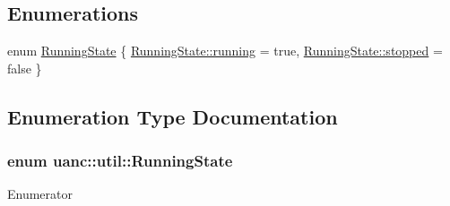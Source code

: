 \subsection*{Enumerations}
\begin{DoxyCompactItemize}
\item 
enum \hyperlink{namespaceuanc_1_1util_a1327e6c853ec100096ba39559392affd}{Running\+State} \{ \hyperlink{namespaceuanc_1_1util_a1327e6c853ec100096ba39559392affda75101dcdfc88455bcafc9e53e0b06689}{Running\+State\+::running} = true, 
\hyperlink{namespaceuanc_1_1util_a1327e6c853ec100096ba39559392affdaf0a0bfe6bc7d2c58d2989034f83183e0}{Running\+State\+::stopped} = false
 \}
\end{DoxyCompactItemize}


\subsection{Enumeration Type Documentation}
\subsubsection[{\texorpdfstring{Running\+State}{RunningState}}]{\setlength{\rightskip}{0pt plus 5cm}enum {\bf uanc\+::util\+::\+Running\+State}\hspace{0.3cm}{\ttfamily [strong]}}\hypertarget{namespaceuanc_1_1util_a1327e6c853ec100096ba39559392affd}{}\label{namespaceuanc_1_1util_a1327e6c853ec100096ba39559392affd}
\begin{Desc}
\item[Enumerator]\par
\begin{description}
\item[{\em 
running\hypertarget{namespaceuanc_1_1util_a1327e6c853ec100096ba39559392affda75101dcdfc88455bcafc9e53e0b06689}{}\label{namespaceuanc_1_1util_a1327e6c853ec100096ba39559392affda75101dcdfc88455bcafc9e53e0b06689}
}]\item[{\em 
stopped\hypertarget{namespaceuanc_1_1util_a1327e6c853ec100096ba39559392affdaf0a0bfe6bc7d2c58d2989034f83183e0}{}\label{namespaceuanc_1_1util_a1327e6c853ec100096ba39559392affdaf0a0bfe6bc7d2c58d2989034f83183e0}
}]\end{description}
\end{Desc}
